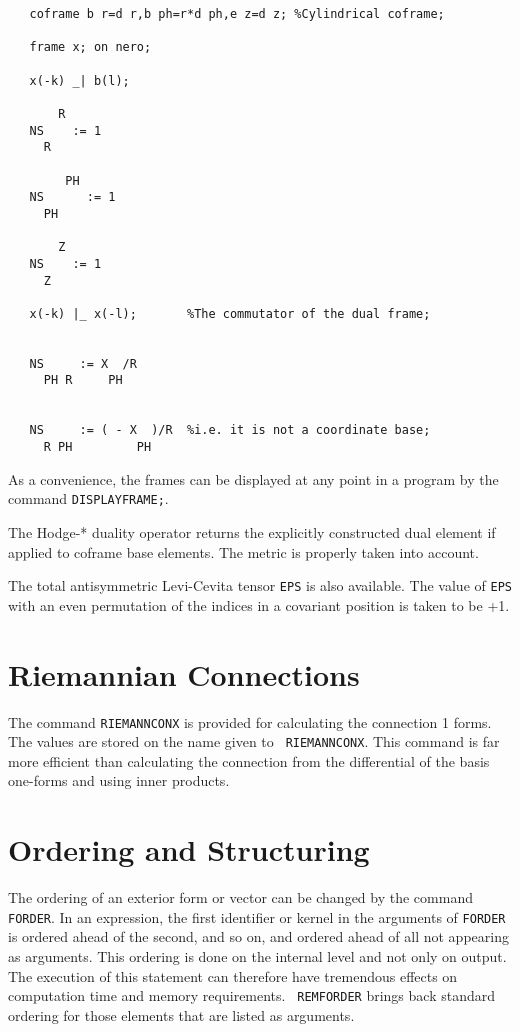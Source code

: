 \example{}

\begin{verbatim}
   coframe b r=d r,b ph=r*d ph,e z=d z; %Cylindrical coframe;

   frame x; on nero;

   x(-k) _| b(l);

       R
   NS    := 1
     R

        PH
   NS      := 1
     PH

       Z
   NS    := 1
     Z

   x(-k) |_ x(-l);       %The commutator of the dual frame;


   NS     := X  /R
     PH R     PH


   NS     := ( - X  )/R  %i.e. it is not a coordinate base;
     R PH         PH

\end{verbatim}

As a convenience, the frames can be displayed at any point in a program
by the command {\tt DISPLAYFRAME;}\label{DISPLAYFRAME}.

The Hodge-* duality operator returns the explicitly constructed dual
element if applied to coframe base elements. The metric is properly
taken into account.

The total antisymmetric Levi-Cevita tensor {\tt EPS}\label{EPS} is
also available.  The value of {\tt EPS} with an even permutation of the
indices in a covariant position is taken to be +1.


\section{Riemannian Connections}

The command {\tt RIEMANNCONX} is provided for calculating the
 \label{RIEMANNCONX}
connection 1 forms.  The values are stored on the name given to {\tt
RIEMANNCONX}.  This command is far more efficient than calculating the
connection from the differential of the basis one-forms and using
inner products.

\section{Ordering and Structuring}

The ordering of an exterior form or vector can be changed by the
command {\tt FORDER}.\label{FORDER}  In an expression, the first
identifier or kernel in the arguments of {\tt FORDER} is ordered ahead
of the second, and so on, and ordered ahead of all not appearing as
arguments.  This ordering is done on the internal level and not only
on output.  The execution of this statement can therefore have
tremendous effects on computation time and memory requirements.  {\tt
REMFORDER}\label{REMFORDER} brings back standard ordering for those
elements that are listed as arguments.

